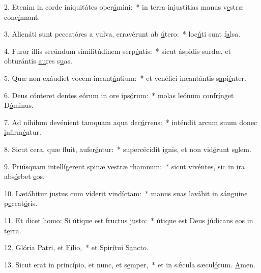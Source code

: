 2. Etenim in corde iniquitátes oper\uline{á}mini:~* in terra injustítias manus v\uline{e}stræ conc\uline{í}nnant.\par 
3. Alienáti sunt peccatóres a vulva, erravérunt ab \uline{ú}tero:~* loc\uline{ú}ti sunt f\uline{a}lsa.\par 
4. Furor illis secúndum similitúdinem serp\uline{é}ntis:~* sicut áspidis surdæ, et obturántis \uline{au}res s\uline{u}as.\par 
5. Quæ non exáudiet vocem incant\uline{á}ntium:~* et venéfici incantántis s\uline{a}pi\uline{é}nter.\par 
6. Deus cónteret dentes eórum in ore ips\uline{ó}rum:~* molas leónum confr\uline{í}nget D\uline{ó}minus.\par 
7. Ad níhilum devénient tamquam aqua dec\uline{ú}rrens:~* inténdit arcum suum donec \uline{i}nfirm\uline{é}ntur.\par 
8. Sicut cera, quæ fluit, aufer\uline{é}ntur:~* supercécidit ignis, et non vid\uline{é}runt s\uline{o}lem.\par 
9. Priúsquam intellígerent spinæ vestræ rh\uline{a}mnum:~* sicut vivéntes, sic in ira abs\uline{ó}rbet \uline{e}os.\par 
10. Lætábitur justus cum víderit vind\uline{í}ctam:~* manus suas lavábit in sánguine p\uline{e}ccat\uline{ó}ris.\par 
11. Et dicet homo: Si útique est fructus j\uline{u}sto:~* útique est Deus júdicans \uline{e}os in t\uline{e}rra.\par 
12. Glória Patri, et F\uline{í}lio,~* et Spir\uline{í}tui S\uline{a}ncto.\par 
13. Sicut erat in princípio, et nunc, et s\uline{e}mper,~* et in sǽcula sæcul\uline{ó}rum. \uline{A}men.\par 
